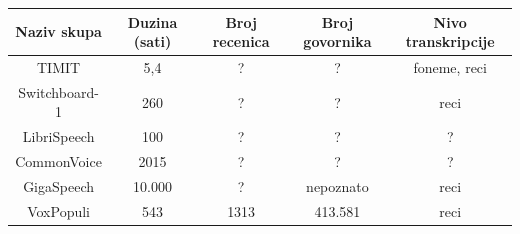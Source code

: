 \documentclass[a4paper]{article}
\begin{document}
\begin{table}[h!]
\begin{center}
  \begin{tabular}{|c|c|c|c|c|}
    \hline
    Naziv skupa   & Duzina (sati) & Broj recenica & Broj govornika & Nivo transkripcije \\
    \hline
    TIMIT         & 5,4           & ?             & ?              & foneme, reci       \\ 
    Switchboard-1 & 260           & ?             & ?              & reci               \\ 
    LibriSpeech   & 100           & ?             & ?              & ?                  \\ 
    CommonVoice   & 2015          & ?             & ?              & ?                  \\
    GigaSpeech    & 10.000        & ?             & nepoznato      & reci               \\
    VoxPopuli     & 543           & 1313          & 413.581        & reci               \\
    \hline
  \end{tabular}
\end{center}
\end{table}
\end{document}
